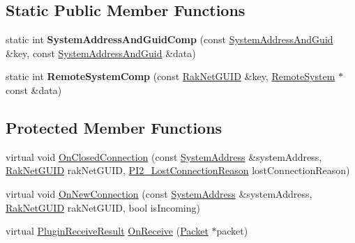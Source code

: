 \subsection*{Static Public Member Functions}
\begin{DoxyCompactItemize}
\item 
\hypertarget{class_rak_net_1_1_connection_graph2_a4fc8d8e21fa362540cfa379d8a413ad6}{static int {\bfseries System\-Address\-And\-Guid\-Comp} (const \hyperlink{struct_rak_net_1_1_connection_graph2_1_1_system_address_and_guid}{System\-Address\-And\-Guid} \&key, const \hyperlink{struct_rak_net_1_1_connection_graph2_1_1_system_address_and_guid}{System\-Address\-And\-Guid} \&data)}\label{class_rak_net_1_1_connection_graph2_a4fc8d8e21fa362540cfa379d8a413ad6}

\item 
\hypertarget{class_rak_net_1_1_connection_graph2_a5ae9eaefd7d018cf233e197eb988c35f}{static int {\bfseries Remote\-System\-Comp} (const \hyperlink{struct_rak_net_1_1_rak_net_g_u_i_d}{Rak\-Net\-G\-U\-I\-D} \&key, \hyperlink{struct_rak_net_1_1_connection_graph2_1_1_remote_system}{Remote\-System} $\ast$const \&data)}\label{class_rak_net_1_1_connection_graph2_a5ae9eaefd7d018cf233e197eb988c35f}

\end{DoxyCompactItemize}
\subsection*{Protected Member Functions}
\begin{DoxyCompactItemize}
\item 
virtual void \hyperlink{class_rak_net_1_1_connection_graph2_a33dcad1914b524d483d69f3b9633dd36}{On\-Closed\-Connection} (const \hyperlink{struct_rak_net_1_1_system_address}{System\-Address} \&system\-Address, \hyperlink{struct_rak_net_1_1_rak_net_g_u_i_d}{Rak\-Net\-G\-U\-I\-D} rak\-Net\-G\-U\-I\-D, \hyperlink{group___p_l_u_g_i_n___i_n_t_e_r_f_a_c_e___g_r_o_u_p_ga376cc546fd6892c2ead48cd51796c8b8}{P\-I2\-\_\-\-Lost\-Connection\-Reason} lost\-Connection\-Reason)
\item 
virtual void \hyperlink{class_rak_net_1_1_connection_graph2_a5fc7c446326e17cbccfba7f37ce2b42d}{On\-New\-Connection} (const \hyperlink{struct_rak_net_1_1_system_address}{System\-Address} \&system\-Address, \hyperlink{struct_rak_net_1_1_rak_net_g_u_i_d}{Rak\-Net\-G\-U\-I\-D} rak\-Net\-G\-U\-I\-D, bool is\-Incoming)
\item 
virtual \hyperlink{group___p_l_u_g_i_n___i_n_t_e_r_f_a_c_e___g_r_o_u_p_ga89998adaafb29e5d879113b992161085}{Plugin\-Receive\-Result} \hyperlink{class_rak_net_1_1_connection_graph2_a952ce38786f2156945d5af7797ff70e8}{On\-Receive} (\hyperlink{struct_rak_net_1_1_packet}{Packet} $\ast$packet)
\end{DoxyCompactItemize}
